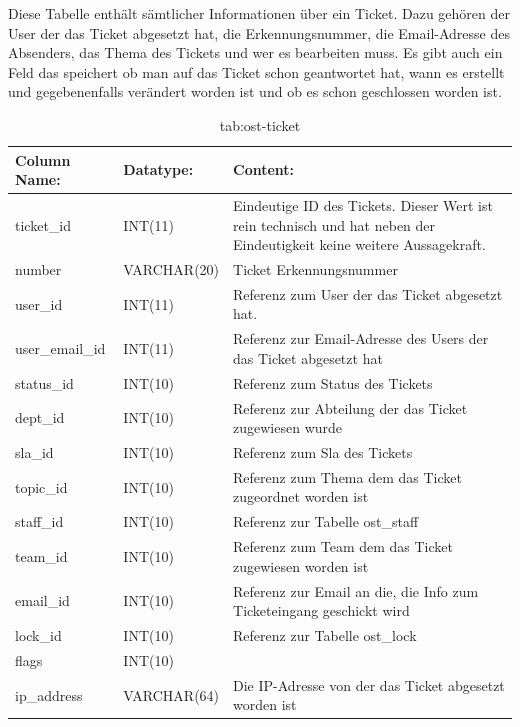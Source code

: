 Diese Tabelle enthält sämtlicher Informationen über ein Ticket. Dazu gehören der User der das Ticket abgesetzt hat, die Erkennungsnummer, die Email-Adresse des Absenders, das Thema des Tickets und wer es bearbeiten muss. Es gibt auch ein Feld das speichert ob man auf das Ticket schon geantwortet hat, wann es erstellt und gegebenenfalls verändert worden ist und ob es schon geschlossen worden ist.


\begin{table}[h]
	\begin{tabular}{|p{3.5cm}|p{4cm}|p{6.2cm}|}
		\hline
		\textbf{Column Name:} & \textbf{Datatype:} & \textbf{Content:}\\
		\hline
		ticket\_id & INT(11) & Eindeutige ID des Tickets. Dieser Wert ist rein technisch und hat  neben der Eindeutigkeit keine weitere 
		Aussagekraft.\\
		\hline
		number & VARCHAR(20) & Ticket Erkennungsnummer \\
		\hline
		user\_id & INT(11) & Referenz zum User der das Ticket abgesetzt hat.\\
		\hline
		user\_email\_id & INT(11) & Referenz zur Email-Adresse des Users der das Ticket abgesetzt hat\\
		\hline
		status\_id & INT(10) & Referenz zum Status des Tickets\\
		\hline
		dept\_id & INT(10) &  Referenz zur Abteilung der das Ticket zugewiesen wurde\\
		\hline
		sla\_id & INT(10) & Referenz zum Sla des Tickets\\
		\hline
		topic\_id & INT(10) & Referenz zum Thema dem das Ticket zugeordnet worden ist\\
		\hline
		staff\_id & INT(10) & Referenz zur Tabelle ost\_staff \\
		\hline
		team\_id & INT(10) & Referenz zum Team dem das Ticket zugewiesen worden ist \\
		\hline
		email\_id & INT(10) & Referenz zur Email an die, die Info zum Ticketeingang geschickt wird \\
		\hline
		lock\_id & INT(10) & Referenz zur Tabelle ost\_lock \\
		\hline
		flags & INT(10) &  \\
		\hline
		ip\_address & VARCHAR(64) & Die IP-Adresse von der das Ticket abgesetzt worden ist \\
		\hline
			\end{tabular}
			\caption{tab:ost-ticket}
		\end{table}
		\label{tab:ost_ticket}
